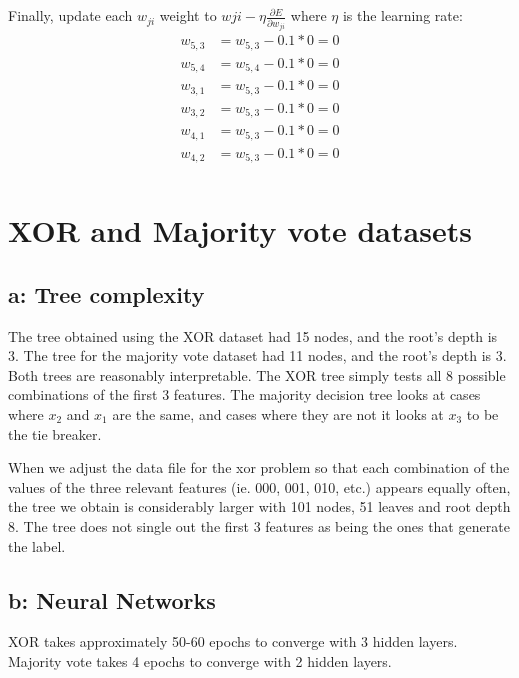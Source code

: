 \documentclass{article}
\begin{document}
\\
\\
Finally, update each $w_{ji}$ weight to $w{ji} - \eta \frac{\partial E}{\partial w_{ji}}$ where $\eta$ is the learning rate:
\begin{align*}
 w_{5,3} &= w_{5,3} - 0.1*0 = 0\\
 w_{5,4} &= w_{5,4} - 0.1*0 = 0\\
 w_{3,1} &= w_{5,3} - 0.1*0 = 0\\
 w_{3,2} &= w_{5,3} - 0.1*0 = 0\\
 w_{4,1} &= w_{5,3} - 0.1*0 = 0\\
 w_{4,2} &= w_{5,3} - 0.1*0 = 0\\
\end{align*}

\section{XOR and Majority vote datasets}

\subsection*{a: Tree complexity}
The tree obtained using the XOR dataset had 15 nodes, and the root's depth is 3.
The tree for the majority vote dataset had 11 nodes, and the root's depth is 3.
Both trees are reasonably interpretable. The XOR tree simply tests all 8 possible combinations of the first 3 features.
The majority decision tree looks at cases where $x_2$ and $x_1$ are the same, and cases where they are not it looks at $x_3$ to be the tie breaker. 


When we adjust the data file for the xor problem so that each combination of the values of the three relevant features (ie. 000, 001, 010, etc.) appears equally often, the tree we obtain is considerably larger with 101 nodes, 51 leaves and root depth 8. The tree does not single out the first 3 features as being the ones that generate the label. 


\subsection*{b: Neural Networks}

XOR takes approximately 50-60 epochs to converge with 3 hidden layers. 
Majority vote takes 4 epochs to converge with 2 hidden layers.
\end{document}

